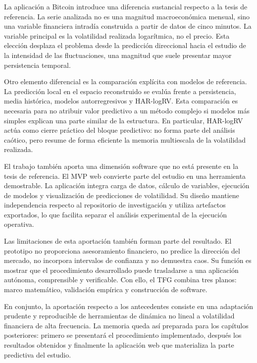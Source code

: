 La aplicación a Bitcoin introduce una diferencia sustancial respecto a la tesis de referencia. La serie analizada no es una magnitud macroeconómica mensual, sino una variable financiera intradía construida a partir de datos de cinco minutos. La variable principal es la volatilidad realizada logarítmica, no el precio. Esta elección desplaza el problema desde la predicción direccional hacia el estudio de la intensidad de las fluctuaciones, una magnitud que suele presentar mayor persistencia temporal.

Otro elemento diferencial es la comparación explícita con modelos de referencia. La predicción local en el espacio reconstruido se evalúa frente a persistencia, media histórica, modelos autorregresivos y HAR-logRV. Esta comparación es necesaria para no atribuir valor predictivo a un método complejo si modelos más simples explican una parte similar de la estructura. En particular, HAR-logRV actúa como cierre práctico del bloque predictivo: no forma parte del análisis caótico, pero resume de forma eficiente la memoria multiescala de la volatilidad realizada.

El trabajo también aporta una dimensión software que no está presente en la tesis de referencia. El MVP web convierte parte del estudio en una herramienta demostrable. La aplicación integra carga de datos, cálculo de variables, ejecución de modelos y visualización de predicciones de volatilidad. Su diseño mantiene independencia respecto al repositorio de investigación y utiliza artefactos exportados, lo que facilita separar el análisis experimental de la ejecución operativa.

Las limitaciones de esta aportación también forman parte del resultado. El prototipo no proporciona asesoramiento financiero, no predice la dirección del mercado, no incorpora intervalos de confianza y no demuestra caos. Su función es mostrar que el procedimiento desarrollado puede trasladarse a una aplicación autónoma, comprensible y verificable. Con ello, el TFG combina tres planos: marco matemático, validación empírica y construcción de software.

En conjunto, la aportación respecto a los antecedentes consiste en una adaptación prudente y reproducible de herramientas de dinámica no lineal a volatilidad financiera de alta frecuencia. La memoria queda así preparada para los capítulos posteriores: primero se presentará el procedimiento implementado, después los resultados obtenidos y finalmente la aplicación web que materializa la parte predictiva del estudio.